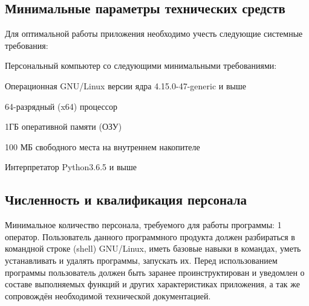 \subsection{Минимальные параметры технических средств}
Для оптимальной работы приложения необходимо учесть следующие системные требования:
\begin{my_enumerate}
    \item Персональный компьютер со следующими минимальными требованиями:
        \begin{my_enumerate}
            \item Операционная GNU/Linux версии ядра 4.15.0-47-generic и выше
            \item 64-разрядный (x64) процессор
            \item 1ГБ оперативной памяти (ОЗУ)
            \item 100 МБ свободного места на внутреннем накопителе
        \end{my_enumerate}
    \item Интерпретатор Python3.6.5 и выше
\end{my_enumerate}


\subsection{Численность и квалификация персонала}
Минимальное количество персонала, требуемого для работы программы: 1 оператор.
Пользователь данного программного продукта должен разбираться в командной
строке (shell) GNU/Linux, иметь базовые навыки в командах, уметь устанавливать
и удалять программы, запускать их. Перед использованием программы
пользователь должен быть заранее проинструктирован и уведомлен о составе
выполняемых функций и других характеристиках приложения, а так же сопровождён
необходимой технической документацией.

